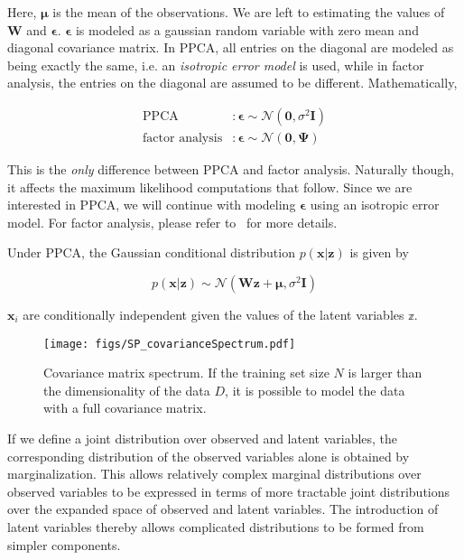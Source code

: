 Here, $\mathbf{\mu}$ is the mean of the observations.  We are left to estimating the values of $\mathbf{W}$ and $\mathbf{\epsilon}$.  $\mathbf{\epsilon}$ is modeled as a gaussian random variable with zero mean and diagonal covariance matrix.  In PPCA, all entries on the diagonal are modeled as being exactly the same, i.e. an \emph{isotropic error model} is used, while in factor analysis, the entries on the diagonal are assumed to be different. Mathematically,

\begin{equation}
\begin{array}{lllll}
\textrm{PPCA} 				&:  \mathbf{\epsilon}\sim \mathcal{N}(\mathbf{0},\sigma^2 \mathbf{I})\\
\textrm{factor analysis} 	&:  \mathbf{\epsilon}\sim \mathcal{N}(\mathbf{0},\mathbf{\Psi})
\end{array}
\end{equation}

This is the \emph{only} difference between PPCA and factor analysis.  Naturally though, it affects the maximum likelihood computations that follow.  Since we are interested in PPCA, we will continue with modeling $\mathbf{\epsilon}$ using an isotropic error model.  For factor analysis, please refer to~\cite{2007_BOOK_PRML_Bishop} for more details.  

Under PPCA, the Gaussian conditional distribution $p(\mathbf{x}|\mathbf{z})$ is given by

\begin{equation}
p(\mathbf{x|z}) \sim \mathcal{N}(\mathbf{Wz} + \mathbf{\mu}, \sigma^2\mathbf{I})
\end{equation}

$\mathbf{x}_i$ are conditionally independent given the values of the latent variables $\mathbb{z}$.




                \begin{figure}
                \centering
                \texttt{[image: figs/SP\_covarianceSpectrum.pdf]}
                \caption{Covariance matrix spectrum.  If the training set size $N$ is larger than the dimensionality of the data $D$, it is possible to model the data with a full covariance matrix.} 
                \label{fig:covariance_matrix_spectrum}
                \end{figure}


If we define a joint distribution over observed and latent variables, the corresponding distribution of the observed variables alone is obtained by marginalization.  This allows relatively complex marginal distributions over observed variables to be expressed in terms of more tractable joint distributions over the expanded space of observed and latent variables.  The introduction of latent variables thereby allows complicated distributions to be formed from simpler components.  



